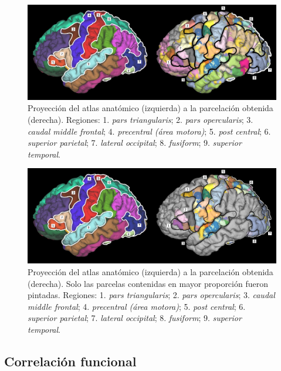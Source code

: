 \begin{figure}[h!]
    \includegraphics[width=\textwidth]{img/anatomica2parcelation.png}
    \caption{Proyecci\'on del atlas anat\'omico (izquierda) a la 
             parcelaci\'on obtenida (derecha). Regiones: 
             1. \textit{pars triangularis}; 2. \textit{pars opercularis};
             3. \textit{caudal middle frontal}; 
             4. \textit{precentral (\'area motora)}; 
             5. \textit{post central}; 6. \textit{superior parietal}; 
             7. \textit{lateral occipital}; 8. \textit{fusiform};
             9. \textit{superior temporal}.  }
    \label{fig:an2pa}
\end{figure}

\begin{figure}[h!]
    \includegraphics[width=\textwidth]{img/anatomica2parcelation2.png}
    \caption{Proyecci\'on del atlas anat\'omico (izquierda) a la 
             parcelaci\'on obtenida (derecha). Solo las parcelas contenidas
             en mayor proporci\'on fueron pintadas. Regiones: 
             1. \textit{pars triangularis}; 2. \textit{pars opercularis};
             3. \textit{caudal middle frontal}; 
             4. \textit{precentral (\'area motora)}; 
             5. \textit{post central}; 6. \textit{superior parietal}; 
             7. \textit{lateral occipital}; 8. \textit{fusiform};
             9. \textit{superior temporal}.  }
    \label{fig:an2pa2}
\end{figure}

\subsection{Correlaci\'on funcional}
\label{sec:corr_funcional}

